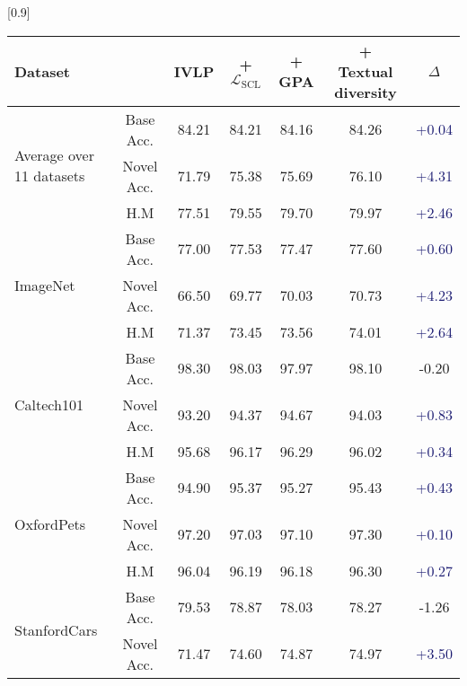 \documentclass[10pt,twocolumn,letterpaper]{article}
\begin{document}
\begin{table*}[!t]
    \small \centering
 \setlength{\tabcolsep}{12pt}
    \scalebox{0.9}[0.9]{
\begin{tabular}{lc|cccc|c}
\toprule
\textbf{Dataset} & 
 & 
\textbf{IVLP} &
\textbf{+ $\mathcal{L}_\text{SCL}$} & 
\textbf{+ GPA} & 
\textbf{ + Textual diversity} &
\textbf{$\Delta$} \\ \midrule
\multirow{3}{*}{Average over 11 datasets}  & Base Acc.& 84.21       & 84.21   & 84.16  & 84.26 &   \textcolor{MidnightBlue}{{+0.04}}\\
                               & Novel Acc.     & 71.79  & 75.38   & 75.69  & 76.10  &   \textcolor{MidnightBlue}{{+4.31}}\\
                               & H.M            & 77.51  & 79.55   & 79.70 &79.97  &   \textcolor{MidnightBlue}{{+2.46}}\\
\midrule
\multirow{3}{*}{ImageNet}      & Base Acc.      & 77.00  & 77.53   &  77.47 &  77.60 &  \textcolor{MidnightBlue}{{+0.60}}\\ 
                               & Novel Acc.     & 66.50  & 69.77   &  70.03 & 70.73&    \textcolor{MidnightBlue}{{+4.23}}\\ 
                               & H.M            & 71.37  & 73.45   &  73.56 & 74.01&  \textcolor{MidnightBlue}{{+2.64}}\\
\midrule
\multirow{3}{*}{Caltech101}    & Base Acc.      & 98.30  & 98.03   & 97.97 & 98.10 &   \textcolor{Bittersweet}{{-0.20}}\\
                               & Novel Acc.     & 93.20  & 94.37   &  94.67 & 94.03 & \textcolor{MidnightBlue}{{+0.83}}\\
                               & H.M            & 95.68  & 96.17   &  96.29 &  96.02 &  \textcolor{MidnightBlue}{{+0.34}}\\
\midrule
\multirow{3}{*}{OxfordPets}    & Base Acc.      & 94.90  & 95.37   & 95.27 & {95.43}   &  \textcolor{MidnightBlue}{{+0.43}}\\
                               & Novel Acc.     & 97.20  & 97.03   & {97.10} & {97.30}  &   \textcolor{MidnightBlue}{{+0.10}}\\
                               & H.M            & 96.04  & 96.19   & {96.18} & {96.30}  &   \textcolor{MidnightBlue}{{+0.27}}\\
\midrule
\multirow{3}{*}{StanfordCars}  & Base Acc.     & 79.53 & 78.87    & 78.03 &78.27 &  \textcolor{Bittersweet}{{-1.26}}\\
                           & Novel Acc.         & 71.47 & 74.60    & 74.87&74.97   &  \textcolor{MidnightBlue}{{+3.50}}\\

\end{tabular}}
\end{table*}
\end{document}
